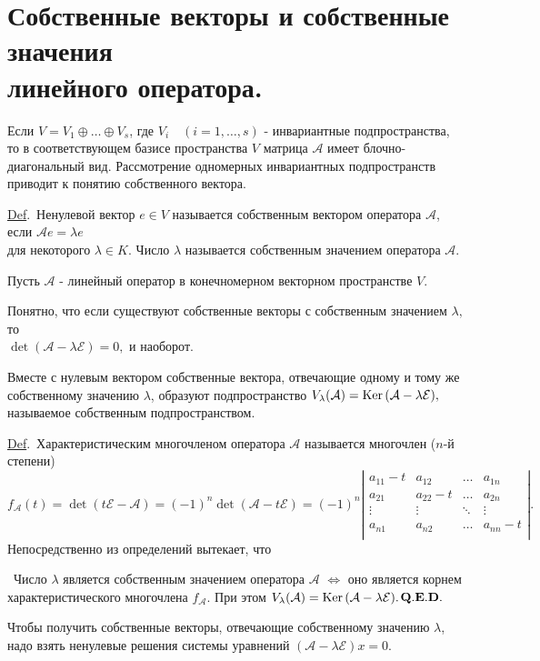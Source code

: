 \documentclass[a4paper]{article}%
\renewcommand{\de}{\par\noindent\underline{Def}.\ }%
\renewcommand{\ab}{\par\noindent}%
\newcommand{\te}{\par\noindent{\bf Теорема.}\ }%
\newcommand{\qed}{\quad${{\bf Q.E.D.}}$}
\newcommand{\lr}{\Leftrightarrow}%
\newcommand{\ps}{\oplus}
\newcommand{\rom}[1]{{\rm#1\,}}
\newcommand{\op}[1]{$\mathcal{#1}$}
\renewcommand{\om}[1]{\mathcal{#1}}
\begin{document}
\section{Собственные векторы и собственные значения\\ линейного оператора.}
\label{q25}%
\ab Если $V=V_1\ps\dots\ps V_s$, где $V_i\quad (i=1,\dots,s)$ - инвариантные подпространства, то в
соответствующем базисе пространства $V$ матрица \op{A} имеет блочно-диагональный вид. Рассмотрение одномерных
инвариантных подпространств приводит к понятию собственного вектора. %
\de Ненулевой вектор $e\in V$ называется собственным вектором оператора \op{A}, если $\om{A}e=\lambda e$\\ для
некоторого $\lambda \in K.$ Число $\lambda$ называется собственным значением оператора \op{A}. %
\ab Пусть \op{A} - линейный оператор в конечномерном векторном пространстве $V$. %
\ab Понятно, что если существуют собственные векторы с собственным значением $\lambda,$ то \\
$\det(\om{A}-\lambda\om{E})=0,$ и наоборот.%
\ab Вместе с нулевым вектором собственные вектора, отвечающие одному и тому же собственному значению $\lambda$,
образуют подпространство $V_\lambda(\om{A})=\rom{Ker}(\om{A}-\lambda\om{E}),$ называемое собственным
подпространством.%
\de Характеристическим многочленом оператора \op{A} называется многочлен ($n$-й степени)
$$
f_{\om{A}}(t)=\det(t\om{E-A})=(-1)^n\det(\om{A}-t\om{E})=(-1)^n\left|%
\begin{array}{cccc}
  a_{11}-t & a_{12} & \dots & a_{1n} \\
  a_{21} & a_{22}-t & \dots & a_{2n} \\
  \vdots & \vdots & \ddots & \vdots \\
  a_{n1} & a_{n2} & \dots & a_{nn}-t \\
\end{array}%
\right|.
$$
Непосредственно из определений вытекает, что %
\te Число $\lambda$ является собственным значением оператора \op{A} $\lr$ оно является корнем
характеристического многочлена $f_{\om{A}}.$ При этом
$V_\lambda(\om{A})=\rom{Ker}(\om{A}-\lambda\om{E}).$\qed %
\ab Чтобы получить собственные векторы, отвечающие собственному значению $\lambda$, надо взять ненулевые решения
системы уравнений $(\om{A}-\lambda\om{E})x=0.$ %
\end{document}

